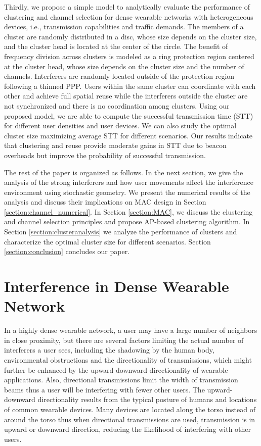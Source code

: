 \documentclass[10pt, conference, letterpaper]{IEEEtran}
\begin{document}
Thirdly, we propose a simple model to analytically evaluate the performance of clustering and channel selection for dense wearable networks with heterogeneous devices, i.e., transmission capabilities and traffic demands. The members of a cluster are randomly distributed in a disc, whose size depends on the cluster size, and the cluster head is located at the center of the circle. The benefit of frequency division across clusters is modeled as a ring protection region centered at the cluster head, whose size depends on the cluster size and the number of channels. Interferers are randomly located outside of the protection region following a thinned PPP. Users within the same cluster can coordinate with each other and achieve full spatial reuse while the interferers outside the cluster are not synchronized and there is no coordination among clusters. Using our proposed model, we are able to compute the successful transmission time (STT) for different user densities and user devices. We can also study the optimal cluster size maximizing average STT for different scenarios. Our results indicate that clustering and reuse provide moderate gains in STT due to beacon overheads but improve the probability of successful transmission. 

The rest of the paper is organized as follows. In the next section, we give the analysis of the strong interferers and how user movements affect the interference environment using stochastic geometry. We present the numerical results of the analysis and discuss their implications on MAC design in Section \ref{section:channel_numerical}. In Section \ref{section:MAC}, we discuss the clustering and channel selection principles and propose AP-based clustering algorithm. In Section \ref{section:clusteranalysis} we analyze the performance of clusters and characterize the optimal cluster size for different scenarios. Section \ref{section:conclusion} concludes our paper. 

\section{Interference in Dense Wearable Network}\label{section:channel}
In a highly dense wearable network, a user may have a large number of neighbors in close proximity, but there are several factors limiting the actual number of interferers a user sees, including the shadowing by the human body, environmental obstructions and the directionality of transmissions, which might further be enhanced by the upward-downward directionality of wearable applications. Also, directional transmissions limit the width of transmission beams thus a user will be interfering with fewer other users. The upward-downward directionality results from the typical posture of humans and locations of common wearable devices. Many devices are located along the torso instead of around the torso thus when directional transmissions are used, transmission is in upward or downward direction, reducing the likelihood of interfering with other users. 
\end{document}
